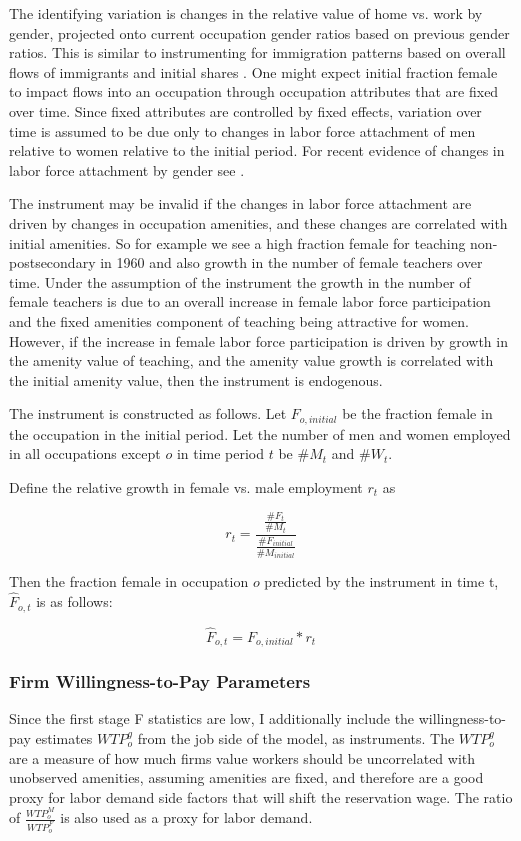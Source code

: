 \documentclass[11pt]{article}
\begin{document}
The identifying variation is changes in the relative value of home vs. work by gender, projected onto current occupation gender ratios based on previous gender ratios. This is similar to instrumenting for immigration patterns based on overall flows of immigrants and initial shares \cite{Altonji1991a}. One might expect initial fraction female to impact flows into an occupation through occupation attributes that are fixed over time. Since fixed attributes are controlled by fixed effects, variation over time is assumed to be due only to changes in labor force attachment of men relative to women relative to the initial period. For recent evidence of changes in labor force attachment by gender see . 

The instrument may be invalid if the changes in labor force attachment are driven by changes in occupation amenities, and these changes are correlated with initial amenities. So for example we see a high fraction female for teaching non-postsecondary in 1960 and also growth in the number of female teachers over time. Under the assumption of the instrument the growth in the number of female teachers is due to an overall increase in female labor force participation and the fixed amenities component of teaching being attractive for women. However, if the increase in female labor force participation is driven by growth in the amenity value of teaching, and the amenity value growth is correlated with the initial amenity value, then the instrument is endogenous.

The instrument is constructed as follows. Let $F_{o,initial}$ be the fraction female in the occupation in the initial period. Let the number of men and women employed in all occupations except $o$ in time period $t$ be $\#M_t$ and $\#W_t$.

Define the relative growth in female vs. male employment $r_t$ as

$$ r_t = \frac{ \frac{\#F_t}{\#M_t} }{ \frac{\#F_{initial}}{\#M_{initial}} }$$

Then the fraction female in occupation $o$ predicted by the instrument in time t, $\hat{F}_{o,t}$ is as follows:

$$\hat{F}_{o,t} = F_{o,initial} * r_t $$

\subsubsection{Firm Willingness-to-Pay Parameters}
Since the first stage F statistics are low, I additionally include the willingness-to-pay estimates $WTP^g_o$ from the job side of the model, as instruments. The $WTP^g_o$ are a measure of how much firms value workers should be uncorrelated with unobserved amenities, assuming amenities are fixed, and therefore are a good proxy for labor demand side factors that will shift the reservation wage. The ratio of $\frac{WTP^M_o}{WTP^F_o}$ is also used as a proxy for labor demand.
\end{document}

